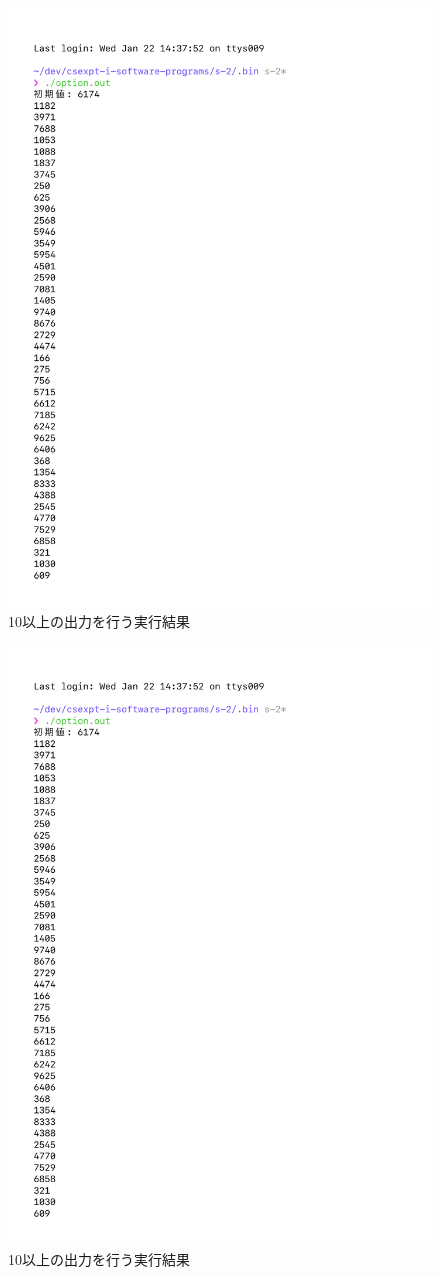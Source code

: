 \begin{figure}[H]
    \ContinuedFloat
    \centering
    \includegraphics[width=0.8\hsize, pagebox=mediabox, page=2]{option_result.pdf}
    \caption{10以上の出力を行う実行結果}
    \label{10以上の出力を行う実行結果}
\end{figure}
\begin{figure}[H]
    \ContinuedFloat
    \centering
    \includegraphics[width=0.8\hsize, pagebox=mediabox, page=3]{option_result.pdf}
    \caption{10以上の出力を行う実行結果}
    \label{10以上の出力を行う実行結果}
\end{figure}

